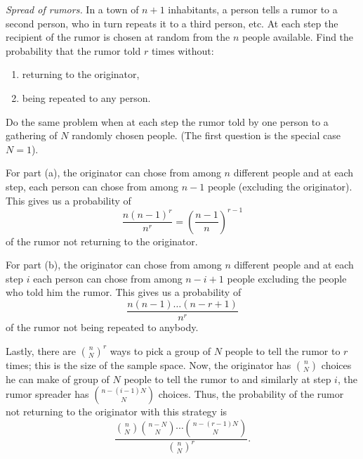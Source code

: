 \begin{problem}[Handout 2, \# 13]
  \emph{Spread of rumors.} In a town of \(n+1\) inhabitants, a person tells
  a rumor to a second person, who in turn repeats it to a third person,
  etc. At each step the recipient of the rumor is chosen at random from the
  \(n\) people available. Find the probability that the rumor told \(r\)
  times without:
  \begin{enumerate}[label=(\alph*),noitemsep]
  \item returning to the originator,
  \item being repeated to any person.
  \end{enumerate}
  Do the same problem when at each step the rumor told by one person to a
  gathering of \(N\) randomly chosen people. (The first question is the
  special case \(N=1\)).
\end{problem}
\begin{solution}
  For part (a), the originator can chose from among \(n\) different people
  and at each step, each person can chose from among \(n-1\) people
  (excluding the originator). This gives us a probability of
  \[
    \frac{n(n-1)^r}{n^r}=\left(\frac{n-1}{n}\right)^{r-1}
  \]
  of the rumor not returning to the originator.

  For part (b), the originator can chose from among \(n\) different people
  and at each step \(i\) each person can chose from among \(n-i+1\) people
  excluding the people who told him the rumor. This gives us a probability
  of
  \[
    \frac{n(n-1)\dotsc(n-r+1)}{n^r}
  \]
  of the rumor not being repeated to anybody.

  Lastly, there are \(\displaystyle\binom{n}{N}^r\) ways to pick a group of
  \(N\) people to tell the rumor to \(r\) times; this is the size of the
  sample space. Now, the originator has \(\displaystyle\binom{n}{N}\)
  choices he can make of group of \(N\) people to tell the rumor to and
  similarly at step \(i\), the rumor spreader has
  \(\displaystyle\binom{n-(i-1)N}{N}\) choices. Thus, the probability of
  the rumor not returning to the originator with this strategy is
  \[
    \frac{\displaystyle\binom{n}{N}\binom{n-N}{N}\dotsm\binom{n-(r-1)N}{N}}
    {\displaystyle\binom{n}{N}^r}.
  \]
\end{solution}
\newpage

